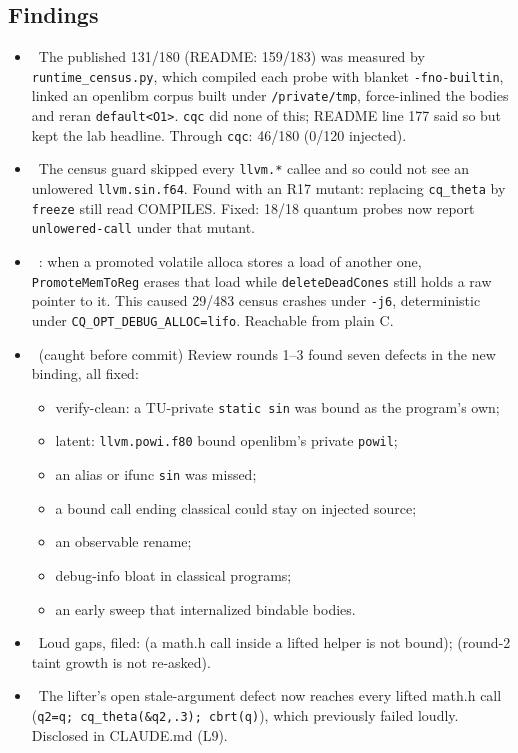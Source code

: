 \subsection*{Findings}
\begin{itemize}
  \item \fdoc\ The published 131/180 (README: 159/183) was measured by
  \texttt{runtime\_census.py}, which compiled each probe with blanket \texttt{-fno-builtin},
  linked an openlibm corpus built under \texttt{/private/tmp}, force-inlined the bodies and
  reran \texttt{default<O1>}. \texttt{cqc} did none of this; README line 177 said so but kept
  the lab headline. Through \texttt{cqc}: 46/180 (0/120 injected).
  \item \fdoc\ The census guard skipped every \texttt{llvm.*} callee and so could not see
  an unlowered \texttt{llvm.sin.f64}. Found with an R17 mutant: replacing \texttt{cq\_theta} by
  \texttt{freeze} still read COMPILES. Fixed: 18/18 quantum probes now report
  \texttt{unlowered-call} under that mutant.
  \item \fpreexisting\ : when a promoted volatile alloca stores a load of another
  one, \texttt{PromoteMemToReg} erases that load while \texttt{deleteDeadCones} still holds a raw
  pointer to it. This caused 29/483 census crashes under \texttt{-j6}, deterministic under
  \texttt{CQ\_OPT\_DEBUG\_ALLOC=lifo}. Reachable from plain C.
  \item \fconfirmed\ (caught before commit) Review rounds 1--3 found seven defects in the new binding, all fixed:
  \begin{itemize}
    \item verify-clean: a TU-private \texttt{static sin} was bound as the program's own;
    \item latent: \texttt{llvm.powi.f80} bound openlibm's private \texttt{powil};
    \item an alias or ifunc \texttt{sin} was missed;
    \item a bound call ending classical could stay on injected source;
    \item an observable rename;
    \item debug-info bloat in classical programs;
    \item an early sweep that internalized bindable bodies.
  \end{itemize}
  \item \foverdecline\ Loud gaps, filed:  (a math.h call inside a lifted helper is
  not bound);  (round-2 taint growth is not re-asked).
  \item \fpreexisting\ The lifter's open stale-argument defect  now reaches every lifted
  math.h call (\texttt{q2=q; cq\_theta(\&q2,.3); cbrt(q)}), which previously failed loudly.
  Disclosed in CLAUDE.md (L9).
\end{itemize}

